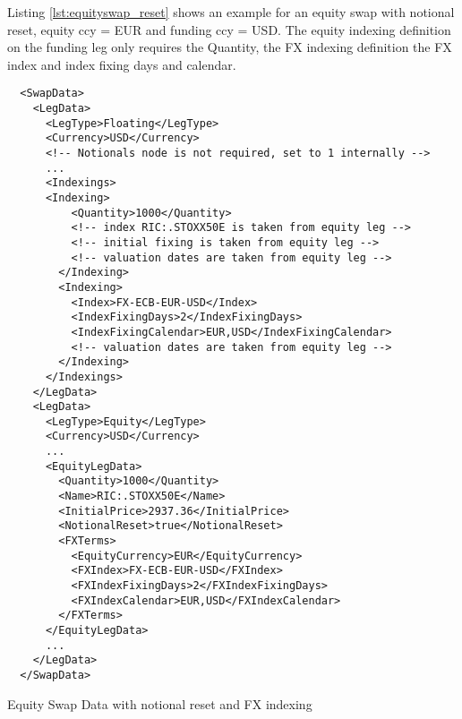 Listing \ref{lst:equityswap_reset} shows an example for an equity swap with notional reset, equity ccy = EUR and funding
ccy = USD. The equity indexing definition on the funding leg only requires the Quantity, the FX indexing definition the
FX index and index fixing days and calendar.


\begin{listing}[H]
\begin{verbatim}
  <SwapData>
    <LegData>
      <LegType>Floating</LegType>
      <Currency>USD</Currency>
      <!-- Notionals node is not required, set to 1 internally -->
      ...
      <Indexings>
      <Indexing>
          <Quantity>1000</Quantity>
          <!-- index RIC:.STOXX50E is taken from equity leg -->
          <!-- initial fixing is taken from equity leg -->
          <!-- valuation dates are taken from equity leg -->
        </Indexing>
        <Indexing>
          <Index>FX-ECB-EUR-USD</Index>
          <IndexFixingDays>2</IndexFixingDays>
          <IndexFixingCalendar>EUR,USD</IndexFixingCalendar>
          <!-- valuation dates are taken from equity leg -->
        </Indexing>
      </Indexings>
    </LegData>
    <LegData>
      <LegType>Equity</LegType>
      <Currency>USD</Currency>
      ...
      <EquityLegData>
        <Quantity>1000</Quantity>
        <Name>RIC:.STOXX50E</Name>
        <InitialPrice>2937.36</InitialPrice>
        <NotionalReset>true</NotionalReset>
        <FXTerms>
          <EquityCurrency>EUR</EquityCurrency>
          <FXIndex>FX-ECB-EUR-USD</FXIndex>
          <FXIndexFixingDays>2</FXIndexFixingDays>
          <FXIndexCalendar>EUR,USD</FXIndexCalendar>
        </FXTerms>
      </EquityLegData>
      ...
    </LegData>
  </SwapData>
\end{verbatim}
\caption{Equity Swap Data with notional reset and FX indexing}
\label{lst:equityswap_reset}
\end{listing}
